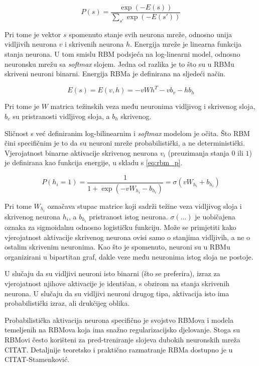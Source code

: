 \documentclass[times, utf8, diplomski, numeric]{fer}
\begin{document}
\begin{equation}
\label{eq:rbm_p}
P(s) = \frac{\exp(-E(s))}{\sum_{s'}\exp(-E(s'))}
\end{equation}

Pri tome je vektor $s$ spomenuto stanje svih neurona mreže, odnosno unija vidljivih neurona $v$ i skrivenih neurona $h$. Energija mreže je linearna funkcija stanja neurona. U tom smislu RBM podsjeća na log-linearni model, odnosno neuronsku mrežu sa \textit{softmax} slojem. Jedna od razlika je to što su u RBMu skriveni neuroni binarni. Energija RBMa je definirana na sljedeći način.

\[
E(s) = E(v, h) = - v W h^T  - v b_v - h b_h
\]

Pri tome je $W$ matrica težinskih veza među neuronima vidljivog i skrivenog sloja, $b_v$ su pristranosti vidljivog sloja, a $b_h$ skrivenog.

Sličnost s već definiranim log-bilinearnim i \textit{softmax} modelom je očita. Što RBM čini specifičnim je to da su neuroni mreže probabilistički, a ne deterministički. Vjerojatnost binarne aktivacije skrivenog neurona $v_i$ (preuzimanja stanja $0$ ili $1$) je definirana kao funkcija energije, u skladu s \ref{eq:rbm_p}.

\[
 P(h_i = 1) = \frac{1}{ 1 + \exp \left( - v W_{h_i} - b_{h_i} \right) } = \sigma( v W_{h_i} + b_{h_i} )
\]

Pri tome $W_{h_i}$ označava stupac matrice koji sadrži težine veza vidljivog sloja i skrivenog neurona $h_i$, a $b_{h_i}$ pristranost istog neurona. $\sigma(...)$ je uobičajena oznaka za sigmoidalnu odnosno logističku funkciju. Može se primjetiti kako vjerojatnost aktivacije skrivenog neurona ovisi samo o stanjima vidljivih, a ne o ostalim skrivenim neuronima. Kao što je spomenuto, neuroni su u RBMu organizirani u bipartitan graf, dakle veze među neuronima istog sloja ne postoje.

U slučaju da su vidljivi neuroni isto binarni (što se preferira), izraz za vjerojatnost njihove aktivacije je identičan, s obzirom na stanja skrivenih neurona. U slučaju da su vidljivi neuroni drugog tipa, aktivacija isto ima probabilistički izraz, ali drukčijeg oblika.

Probabilistička aktivacija neurona specifično je svojstvo RBMova i modela temeljenih na RBMova koja ima snažno regularizacijsko djelovanje. Stoga su RBMovi često korišteni za pred-treniranje slojeva dubokih neuronskih mreža CITAT. Detaljnije teoretsko i praktično razmatranje RBMa dostupno je u CITAT-Stamenković.
\end{document}
